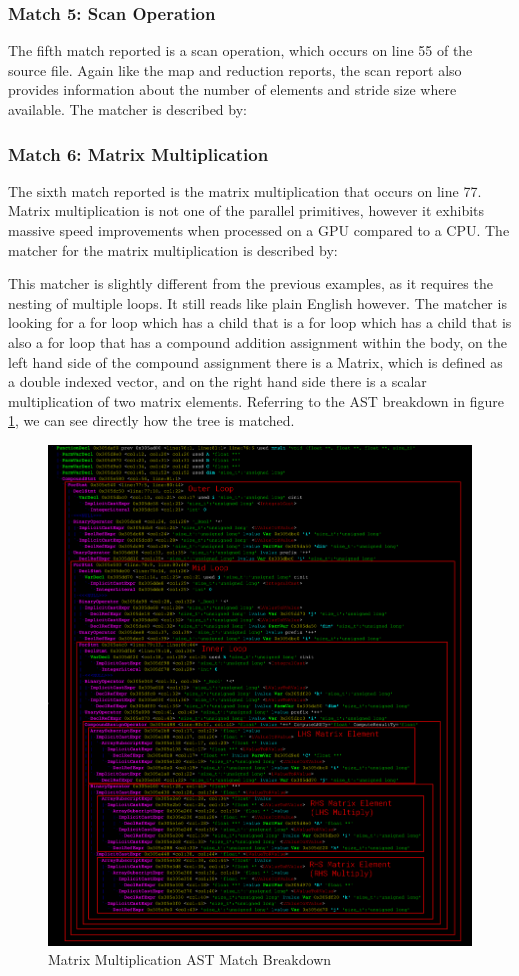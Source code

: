 \subsubsection{Match 5: Scan Operation}
The fifth match reported is a scan operation, which occurs on line 55 of the source file. Again like
the map and reduction reports, the scan report also provides information about the number of
elements and stride size where available. The matcher is described by:


\subsubsection{Match 6: Matrix Multiplication}
The sixth match reported is the matrix multiplication that occurs on line 77. Matrix multiplication
is not one of the parallel primitives, however it exhibits massive speed improvements when processed
on a GPU compared to a CPU. The matcher for the matrix multiplication is described by:

This matcher is slightly different from the previous examples, as it requires the nesting of
multiple loops. It still reads like plain English however. The matcher is looking for a for loop
which has a child that is a for loop which has a child that is also a for loop that has a compound
addition assignment within the body, on the left hand side of the compound assignment there is a
Matrix, which is defined as a double indexed vector, and on the right hand side there is a scalar
multiplication of two matrix elements. Referring to the AST breakdown in figure \ref{mmul_ast}, we
can see directly how the tree is matched.
\begin{figure}[H]
\includegraphics[width=\textwidth]{./Pictures/mmult_ast.png}
\caption{Matrix Multiplication AST Match Breakdown}\label{mmul_ast}
\end{figure}
